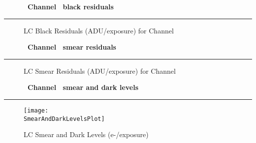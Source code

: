 
\cleardoublepage
\begin{figure*}[h!]
  \centering
  \hfill
  {\Huge {\bf \quarter\ Channel \channel\ black residuals}}
  \hfill
\end{figure*}
\hrule
\vfill
\begin{figure*}[h!]
  \centering
  \caption{LC Black Residuals (ADU/exposure) for Channel \channel}
\end{figure*}

\cleardoublepage
\begin{figure*}[h!]
  \centering
  \hfill
  {\Huge {\bf \quarter\ Channel \channel\ smear residuals}}
  \hfill
\end{figure*}
\hrule
\begin{figure*}[h!]
  \centering
  \hfill
  \caption{LC Smear Residuals (ADU/exposure) for Channel \channel}
\end{figure*}

\cleardoublepage
\begin{figure*}[h!]
  \centering
  \hfill
  {\Huge {\bf \quarter\ Channel \channel\ smear and dark levels}}
  \hfill
\end{figure*}
\hrule

\begin{figure*}[h!]
  \centering
  \texttt{[image: \\SmearAndDarkLevelsPlot]}
  \caption{LC Smear and Dark Levels (e-/exposure)}
\end{figure*}

